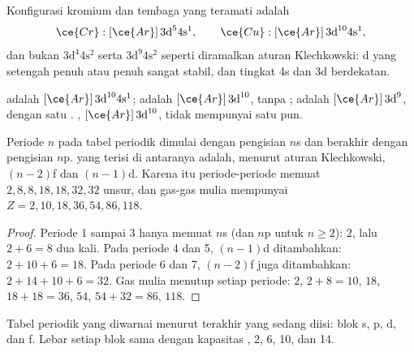 \begin{proposition}\label{prop:b1:quantum-numbers:exceptions}
Konfigurasi  kromium dan tembaga yang teramati adalah
\[
  \ce{Cr}: [\ce{Ar}]\,3\text{d}^5 4\text{s}^1, \qquad
  \ce{Cu}: [\ce{Ar}]\,3\text{d}^{10} 4\text{s}^1 ,
\]
dan bukan $3\text{d}^4 4\text{s}^2$ serta $3\text{d}^9 4\text{s}^2$
seperti diramalkan aturan Klechkowski:  d yang setengah penuh
atau penuh sangat stabil, dan tingkat 4s dan 3d berdekatan.
\end{proposition}

\begin{example}\label{ex:b1:quantum-numbers:copper}
 adalah $[\ce{Ar}]\,3\text{d}^{10} 4\text{s}^1$;  adalah
$[\ce{Ar}]\,3\text{d}^{10}$, tanpa ; 
adalah $[\ce{Ar}]\,3\text{d}^9$, dengan satu .
, $[\ce{Ar}]\,3\text{d}^{10}$, tidak mempunyai satu pun.
\end{example}

\begin{proposition}\label{prop:b1:quantum-numbers:table}
Periode $n$ pada tabel periodik dimulai dengan pengisian $n$s dan
berakhir dengan pengisian $n$p.  yang terisi di
antaranya adalah, menurut aturan Klechkowski, $(n-2)$f dan $(n-1)$d.
Karena itu periode-periode memuat $2, 8, 8, 18, 18, 32, 32$ unsur, dan
gas-gas mulia mempunyai $Z = 2, 10,
18, 36, 54, 86, 118$.
\end{proposition}

\begin{proof}
Periode 1 sampai 3 hanya memuat $n$s (dan $n$p untuk $n \ge 2$): $2$,
lalu $2 + 6 = 8$ dua kali. Pada periode 4 dan 5, $(n-1)$d ditambahkan:
$2 + 10 + 6 =
18$. Pada periode 6 dan 7, $(n-2)$f juga ditambahkan:
$2 + 14 + 10 + 6 = 32$. Gas mulia menutup setiap periode: $2$,
$2 + 8 = 10$, $18$, $18 + 18 = 36$, $54$, $54 + 32 = 86$, $118$.
\end{proof}

\begin{omfigure}
\omperiodictable[colour=blocks, legend]

{\small Tabel periodik yang diwarnai menurut  terakhir yang sedang
diisi: blok s, p, d, dan f. Lebar setiap blok sama dengan kapasitas
, 2, 6, 10, dan 14.}
\end{omfigure}


